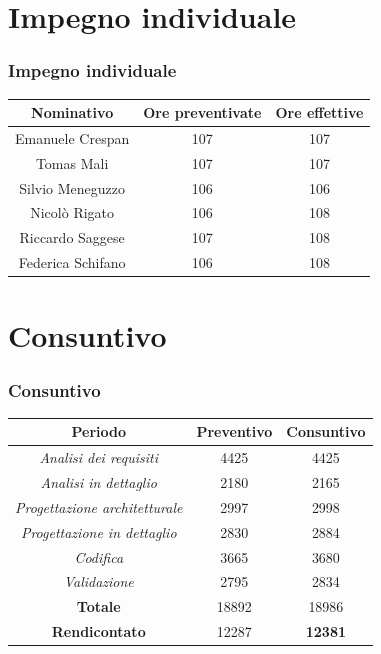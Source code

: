 \section{Impegno individuale}
\begin{frame}
	\frametitle{Impegno individuale}	
	\begin{center}
		\centering
		\begin{tabular}{|c|c|c|}
			\hline
			\textbf{Nominativo} & \textbf{Ore preventivate} & \textbf{Ore effettive} \\
			\hline Emanuele Crespan	  & 107  & 107 \\
			\hline Tomas Mali  & 107  & 107  \\
			\hline Silvio Meneguzzo  & 106  & 106  \\
			\hline Nicolò Rigato  & 106  & 108  \\
			\hline Riccardo Saggese   & 107  & 108  \\
			\hline Federica Schifano  & 106  & 108  \\
			\hline
		
			\end{tabular}
		
	\end{center}
	
\end{frame}

\section{Consuntivo}
\begin{frame}
	\frametitle{Consuntivo}

\begin{center}
	\centering
	\begin{tabular}{|c|c|c|}
		\hline
		\textbf{Periodo} & \textbf{Preventivo} & \textbf{Consuntivo} \\
		\hline	\emph{Analisi dei requisiti}  &4425  &4425 \\
		\hline  \emph{Analisi in dettaglio}  &2180  &2165  \\
		\hline  \emph{Progettazione architetturale}  &2997  &2998  \\
		\hline  \emph{Progettazione in dettaglio}  &2830  &2884  \\
		\hline  \emph{Codifica}  &3665  &3680  \\
		\hline  \emph{Validazione}  &2795  &2834  \\
		\hline
		\textbf{Totale} &18892  & 18986  \\
		\hline
		\textbf{Rendicontato} &12287  & \textbf{12381} \\
		\hline
	\end{tabular}
	
\end{center}

\end{frame}